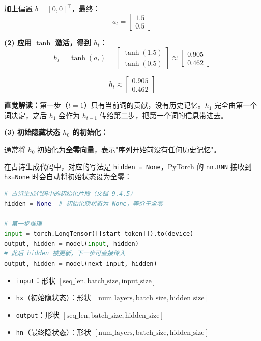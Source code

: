 \documentclass[a4paper,11pt]{ctexart}
\begin{document}
\begin{solutionbox}[参考答案与详细解析]
    加上偏置 $b = [0, 0]^\top$，最终：
    \[
    \boxed{a_t = \begin{bmatrix} 1.5 \\ 0.5 \end{bmatrix}}
    \]

    \vspace{0.5em}
    \textbf{(2) 应用 $\tanh$ 激活，得到 $h_t$：}
    \[
    h_t = \tanh(a_t) =
    \begin{bmatrix} \tanh(1.5) \\ \tanh(0.5) \end{bmatrix}
    \approx
    \begin{bmatrix} 0.905 \\ 0.462 \end{bmatrix}
    \]

    \[
    \boxed{h_t \approx \begin{bmatrix} 0.905 \\ 0.462 \end{bmatrix}}
    \]

    \textbf{直觉解读：}第一步（$t=1$）只有当前词的贡献，没有历史记忆。$h_1$ 完全由第一个词决定，之后 $h_1$ 会作为 $h_{t-1}$ 传给第二步，把第一个词的信息带进去。

    \vspace{0.5em}
    \textbf{(3) 初始隐藏状态 $h_0$ 的初始化：}

    通常将 $h_0$ 初始化为\textbf{全零向量}，表示"序列开始前没有任何历史记忆"。

    在古诗生成代码中，对应的写法是 \texttt{hidden = None}，PyTorch 的 \texttt{nn.RNN} 接收到 \texttt{hx=None} 时会自动将初始状态设为全零：

    \begin{lstlisting}[language=Python]
# 古诗生成代码中的初始化片段（文档 9.4.5）
hidden = None  # 初始化隐状态为 None，等价于全零

# 第一步推理
input = torch.LongTensor([[start_token]]).to(device)
output, hidden = model(input, hidden)
# 此后 hidden 被更新，下一步可直接传入
output, hidden = model(next_input, hidden)
    \end{lstlisting}

    \begin{keybox}
        \begin{itemize}
            \item \texttt{input}：形状 $[\text{seq\_len}, \text{batch\_size}, \text{input\_size}]$
            \item \texttt{hx}（初始隐状态）：形状 $[\text{num\_layers}, \text{batch\_size}, \text{hidden\_size}]$
            \item \texttt{output}：形状 $[\text{seq\_len}, \text{batch\_size}, \text{hidden\_size}]$
            \item \texttt{hn}（最终隐状态）：形状 $[\text{num\_layers}, \text{batch\_size}, \text{hidden\_size}]$
        \end{itemize}
    \end{keybox}
\end{solutionbox}
\end{document}
